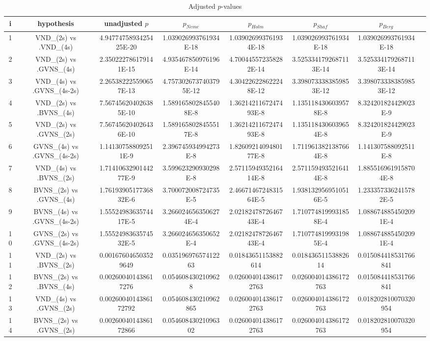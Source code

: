 \documentclass[a4paper,10pt]{article}
\begin{document}
\begin{landscape}
\begin{table}[!htp]
\centering\tiny
\caption{Adjusted $p$-values}
\begin{tabular}{cccccccc}
i&hypothesis&unadjusted $p$&$p_{Neme}$&$p_{Holm}$&$p_{Shaf}$&$p_{Berg}$\\
\hline
1&VND_(2s) vs .VND_(4s)&4.9477475893425425E-20&1.039026993761934E-18&1.039026993761934E-18&1.039026993761934E-18&1.039026993761934E-18\\
2&VND_(2s) vs .GVNS_(4s)&2.350222786179141E-15&4.935467850976196E-14&4.700445572358282E-14&3.5253341792687113E-14&3.5253341792687113E-14\\
3&VND_(4s) vs .GVNS_(4s-2s)&2.265382225590657E-13&4.7573026737403795E-12&4.304226228622248E-12&3.3980733383859853E-12&3.3980733383859853E-12\\
4&VND_(2s) vs .BVNS_(4s)&7.567456204026385E-10&1.5891658028455408E-8&1.3621421167247493E-8&1.1351184306039578E-8&8.324201824429023E-9\\
5&VND_(2s) vs .GVNS_(2s)&7.567456204026436E-10&1.5891658028455517E-8&1.3621421167247493E-8&1.1351184306039654E-8&8.324201824429023E-9\\
6&GVNS_(4s) vs .GVNS_(4s-2s)&1.141307588092511E-9&2.396745934994273E-8&1.8260921409480177E-8&1.7119613821387664E-8&1.141307588092511E-8\\
7&VND_(4s) vs .BVNS_(2s)&1.7141063290144277E-9&3.599623290930298E-8&2.5711594935216414E-8&2.5711594935216414E-8&1.8855169619158704E-8\\
8&BVNS_(2s) vs .GVNS_(4s)&1.7619390517736832E-6&3.700072008724735E-5&2.4667146724831564E-5&1.9381329569510516E-5&1.2333573362415782E-5\\
9&BVNS_(4s) vs .GVNS_(4s-2s)&1.5552498363574417E-5&3.2660246563506274E-4&2.0218247872646743E-4&1.7107748199931858E-4&1.0886748854502091E-4\\
10&GVNS_(2s) vs .GVNS_(4s-2s)&1.5552498363574532E-5&3.266024656350652E-4&2.0218247872646743E-4&1.7107748199931985E-4&1.0886748854502091E-4\\
11&VND_(2s) vs .BVNS_(2s)&0.001676046503529649&0.03519697657412263&0.01843651153882614&0.01843651153882614&0.015084418531766841\\
12&BVNS_(2s) vs .BVNS_(4s)&0.002600401438617276&0.0546084302109628&0.026004014386172763&0.026004014386172763&0.015084418531766841\\
13&VND_(4s) vs .GVNS_(2s)&0.0026004014386172792&0.054608430210962865&0.026004014386172763&0.026004014386172763&0.018202810070320954\\
14&BVNS_(2s) vs .GVNS_(2s)&0.0026004014386172866&0.05460843021096302&0.026004014386172763&0.026004014386172763&0.018202810070320954\\

\end{tabular}
\end{table}
\end{landscape}
\end{document}
